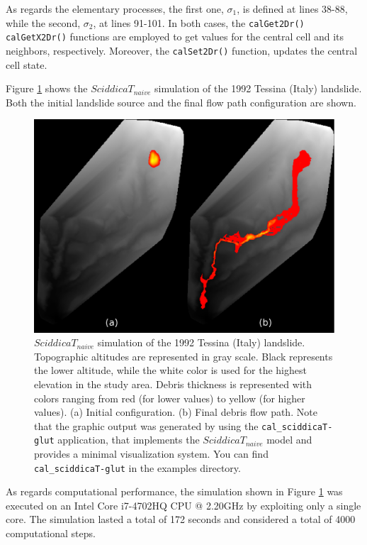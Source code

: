 As regards the elementary processes, the first one, $\sigma_1$, is
defined at lines 38-88, while the second, $\sigma_2$, at lines
91-101. In both cases, the \verb'calGet2Dr()' \verb'calGetX2Dr()'
functions are employed to get values for the central cell and its
neighbors, respectively. Moreover, the \verb'calSet2Dr()' function,
updates the central cell state.

Figure \ref{fig:sciddicaT} shows the $SciddicaT_{naive}$ simulation of the 1992
Tessina (Italy) landslide. Both the initial landslide source and the
final flow path configuration are shown.

\begin{figure}[htbp]
  \centering
  \includegraphics[width=11.5cm]{./images/OpenCAL/sciddicaT}
  \caption{$SciddicaT_{naive}$ simulation of the 1992 Tessina (Italy)
    landslide. Topographic altitudes are represented in gray
    scale. Black represents the lower altitude, while the white color
    is used for the highest elevation in the study area. Debris
    thickness is represented with colors ranging from red (for lower
    values) to yellow (for higher values). (a) Initial
    configuration. (b) Final debris flow path. Note that the graphic
    output was generated by using the \texttt{cal\_sciddicaT-glut}
    application, that implements the $SciddicaT_{naive}$ model and
    provides a minimal visualization system. You can find
    \texttt{cal\_sciddicaT-glut} in the examples directory.}
  \label{fig:sciddicaT}
\end{figure}

As regards computational performance, the simulation shown in Figure
\ref{fig:sciddicaT} was executed on an Intel Core i7-4702HQ CPU @
2.20GHz by exploiting only a single core. The simulation lasted a
total of 172 seconds and considered a total of 4000 computational
steps.


